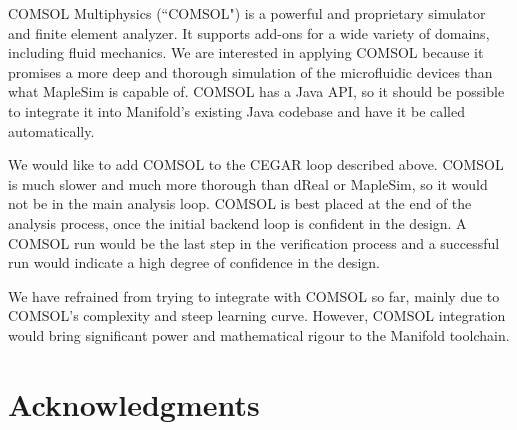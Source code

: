 COMSOL Multiphysics (``COMSOL") is a powerful and proprietary simulator and finite element analyzer.
It supports add-ons for a wide variety of domains, including fluid mechanics.
We are interested in applying COMSOL because it promises a more deep and thorough simulation of the microfluidic devices than what MapleSim is capable of.
COMSOL has a Java API, so it should be possible to integrate it into Manifold's existing Java codebase and have it be called automatically.


We would like to add COMSOL to the CEGAR loop described above.
COMSOL is much slower and much more thorough than dReal or MapleSim, so it would not be in the main analysis loop.
COMSOL is best placed at the end of the analysis process, once the initial backend loop is confident in the design.
A COMSOL run would be the last step in the verification process and a successful run would indicate a high degree of confidence in the design.

We have refrained from trying to integrate with COMSOL so far, mainly due to COMSOL's complexity and steep learning curve.
However, COMSOL integration would bring significant power and mathematical rigour to the Manifold toolchain.

\section{Acknowledgments}


